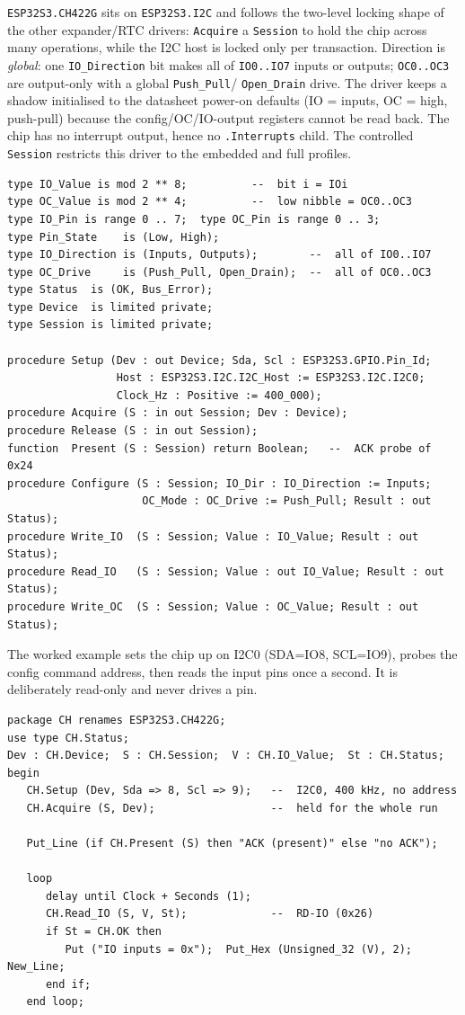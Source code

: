 \texttt{ESP32S3.CH422G} sits on \texttt{ESP32S3.I2C} and follows the two-level
locking shape of the other expander/RTC drivers: \texttt{Acquire} a
\texttt{Session} to hold the chip across many operations, while the I2C host is
locked only per transaction. Direction is \emph{global}: one
\texttt{IO\_Direction} bit makes all of \texttt{IO0..IO7} inputs or outputs;
\texttt{OC0..OC3} are output-only with a global \texttt{Push\_Pull}/%
\texttt{Open\_Drain} drive. The driver keeps a shadow initialised to the datasheet power-on defaults (IO =
inputs, OC = high, push-pull) because the config/OC/IO-output registers cannot
be read back. The chip has no interrupt output,
hence no \texttt{.Interrupts} child. The controlled \texttt{Session} restricts this
driver to the embedded and full profiles.

\begin{lstlisting}
type IO_Value is mod 2 ** 8;          --  bit i = IOi
type OC_Value is mod 2 ** 4;          --  low nibble = OC0..OC3
type IO_Pin is range 0 .. 7;  type OC_Pin is range 0 .. 3;
type Pin_State    is (Low, High);
type IO_Direction is (Inputs, Outputs);        --  all of IO0..IO7
type OC_Drive     is (Push_Pull, Open_Drain);  --  all of OC0..OC3
type Status  is (OK, Bus_Error);
type Device  is limited private;
type Session is limited private;

procedure Setup (Dev : out Device; Sda, Scl : ESP32S3.GPIO.Pin_Id;
                 Host : ESP32S3.I2C.I2C_Host := ESP32S3.I2C.I2C0;
                 Clock_Hz : Positive := 400_000);
procedure Acquire (S : in out Session; Dev : Device);
procedure Release (S : in out Session);
function  Present (S : Session) return Boolean;   --  ACK probe of 0x24
procedure Configure (S : Session; IO_Dir : IO_Direction := Inputs;
                     OC_Mode : OC_Drive := Push_Pull; Result : out Status);
procedure Write_IO  (S : Session; Value : IO_Value; Result : out Status);
procedure Read_IO   (S : Session; Value : out IO_Value; Result : out Status);
procedure Write_OC  (S : Session; Value : OC_Value; Result : out Status);
\end{lstlisting}

The worked example sets the chip up on I2C0 (SDA=IO8, SCL=IO9), probes the config
command address, then reads the input pins once a second. It is deliberately
read-only and never drives a pin.

\begin{lstlisting}
package CH renames ESP32S3.CH422G;
use type CH.Status;
Dev : CH.Device;  S : CH.Session;  V : CH.IO_Value;  St : CH.Status;
begin
   CH.Setup (Dev, Sda => 8, Scl => 9);   --  I2C0, 400 kHz, no address
   CH.Acquire (S, Dev);                  --  held for the whole run

   Put_Line (if CH.Present (S) then "ACK (present)" else "no ACK");

   loop
      delay until Clock + Seconds (1);
      CH.Read_IO (S, V, St);             --  RD-IO (0x26)
      if St = CH.OK then
         Put ("IO inputs = 0x");  Put_Hex (Unsigned_32 (V), 2);  New_Line;
      end if;
   end loop;
\end{lstlisting}

